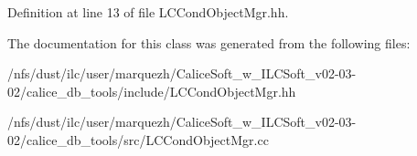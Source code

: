 Definition at line 13 of file L\-C\-Cond\-Object\-Mgr.\-hh.



The documentation for this class was generated from the following files\-:\begin{DoxyCompactItemize}
\item 
/nfs/dust/ilc/user/marquezh/\-Calice\-Soft\-\_\-w\-\_\-\-I\-L\-C\-Soft\-\_\-v02-\/03-\/02/calice\-\_\-db\-\_\-tools/include/L\-C\-Cond\-Object\-Mgr.\-hh\item 
/nfs/dust/ilc/user/marquezh/\-Calice\-Soft\-\_\-w\-\_\-\-I\-L\-C\-Soft\-\_\-v02-\/03-\/02/calice\-\_\-db\-\_\-tools/src/L\-C\-Cond\-Object\-Mgr.\-cc\end{DoxyCompactItemize}
